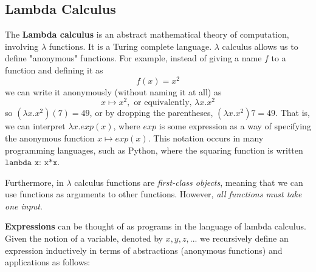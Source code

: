   \subsection{Lambda Calculus}
  The \textbf{Lambda calculus} is an abstract mathematical theory of computation, involving $\lambda$ functions. It is a Turing complete language. $\lambda$ calculus allows us to define "anonymous" functions. For example, instead of giving a name $f$ to a function and defining it as 
  \begin{equation}
    f(x) = x^2
  \end{equation}
  we can write it anonymously (without naming it at all) as 
  \begin{equation}
    x \mapsto x^2, \text{ or equivalently, } \lambda x . x^2
  \end{equation}
  so $(\lambda x.x^2) (7) = 49$, or by dropping the parentheses,  $(\lambda x.x^2) 7 = 49$. That is, we can interpret $\lambda x.exp(x)$, where $exp$ is some expression as a way of specifying the anonymous function $x \mapsto exp(x)$. This notation occurs in many programming languages, such as Python, where the squaring function is written $\texttt{lambda x: x*x}$.  

  Furthermore, in $\lambda$ calculus functions are \textit{first-class objects}, meaning that we can use functions as arguments to other functions. However, \textit{all functions must take one input}. 

  \textbf{Expressions} can be thought of as programs in the language of lambda calculus. Given the notion of a variable, denoted by $x, y, z, ...$ we recursively define an expression inductively in terms of abstractions (anonymous functions) and applications as follows: 

